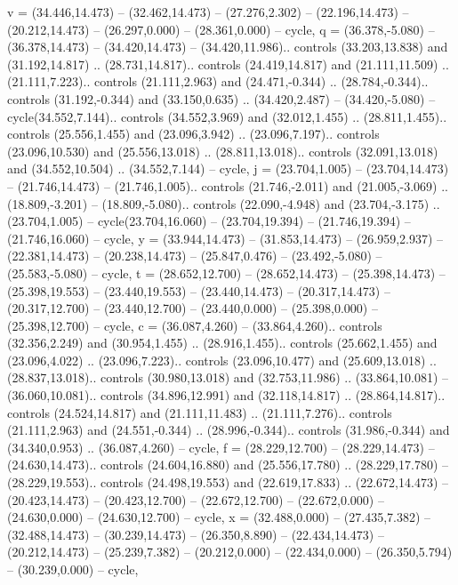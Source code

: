 {v} = {(34.446,14.473) -- (32.462,14.473) -- (27.276,2.302) -- (22.196,14.473) -- (20.212,14.473) -- (26.297,0.000) -- (28.361,0.000) -- cycle},
{q} = {(36.378,-5.080) -- (36.378,14.473) -- (34.420,14.473) -- (34.420,11.986).. controls (33.203,13.838) and (31.192,14.817) .. (28.731,14.817).. controls (24.419,14.817) and (21.111,11.509) .. (21.111,7.223).. controls (21.111,2.963) and (24.471,-0.344) .. (28.784,-0.344).. controls (31.192,-0.344) and (33.150,0.635) .. (34.420,2.487) -- (34.420,-5.080) -- cycle(34.552,7.144).. controls (34.552,3.969) and (32.012,1.455) .. (28.811,1.455).. controls (25.556,1.455) and (23.096,3.942) .. (23.096,7.197).. controls (23.096,10.530) and (25.556,13.018) .. (28.811,13.018).. controls (32.091,13.018) and (34.552,10.504) .. (34.552,7.144) -- cycle},
{j} = {(23.704,1.005) -- (23.704,14.473) -- (21.746,14.473) -- (21.746,1.005).. controls (21.746,-2.011) and (21.005,-3.069) .. (18.809,-3.201) -- (18.809,-5.080).. controls (22.090,-4.948) and (23.704,-3.175) .. (23.704,1.005) -- cycle(23.704,16.060) -- (23.704,19.394) -- (21.746,19.394) -- (21.746,16.060) -- cycle},
{y} = {(33.944,14.473) -- (31.853,14.473) -- (26.959,2.937) -- (22.381,14.473) -- (20.238,14.473) -- (25.847,0.476) -- (23.492,-5.080) -- (25.583,-5.080) -- cycle},
{t} = {(28.652,12.700) -- (28.652,14.473) -- (25.398,14.473) -- (25.398,19.553) -- (23.440,19.553) -- (23.440,14.473) -- (20.317,14.473) -- (20.317,12.700) -- (23.440,12.700) -- (23.440,0.000) -- (25.398,0.000) -- (25.398,12.700) -- cycle},
{c} = {(36.087,4.260) -- (33.864,4.260).. controls (32.356,2.249) and (30.954,1.455) .. (28.916,1.455).. controls (25.662,1.455) and (23.096,4.022) .. (23.096,7.223).. controls (23.096,10.477) and (25.609,13.018) .. (28.837,13.018).. controls (30.980,13.018) and (32.753,11.986) .. (33.864,10.081) -- (36.060,10.081).. controls (34.896,12.991) and (32.118,14.817) .. (28.864,14.817).. controls (24.524,14.817) and (21.111,11.483) .. (21.111,7.276).. controls (21.111,2.963) and (24.551,-0.344) .. (28.996,-0.344).. controls (31.986,-0.344) and (34.340,0.953) .. (36.087,4.260) -- cycle},
{f} = {(28.229,12.700) -- (28.229,14.473) -- (24.630,14.473).. controls (24.604,16.880) and (25.556,17.780) .. (28.229,17.780) -- (28.229,19.553).. controls (24.498,19.553) and (22.619,17.833) .. (22.672,14.473) -- (20.423,14.473) -- (20.423,12.700) -- (22.672,12.700) -- (22.672,0.000) -- (24.630,0.000) -- (24.630,12.700) -- cycle},
{x} = {(32.488,0.000) -- (27.435,7.382) -- (32.488,14.473) -- (30.239,14.473) -- (26.350,8.890) -- (22.434,14.473) -- (20.212,14.473) -- (25.239,7.382) -- (20.212,0.000) -- (22.434,0.000) -- (26.350,5.794) -- (30.239,0.000) -- cycle},
